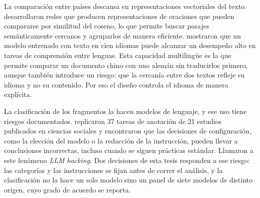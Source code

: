 La comparación entre países descansa en representaciones vectoriales del texto.
\citet{reimers2019sentencebert} desarrollaron redes que producen representaciones de
oraciones que pueden compararse por similitud del coseno, lo que permite buscar pasajes
semánticamente cercanos y agruparlos de manera eficiente. \citet{conneau2020unsupervised}
mostraron que un modelo entrenado con texto en cien idiomas puede alcanzar un desempeño
alto en tareas de comprensión entre lenguas. Esta capacidad multilingüe es la que permite
comparar un documento chino con uno alemán sin traducirlos primero, aunque también
introduce un riesgo: que la cercanía entre dos textos refleje su idioma y no su contenido.
Por eso el diseño controla el idioma de manera explícita.

La clasificación de los fragmentos la hacen modelos de lenguaje, y ese uso tiene riesgos
documentados. \citet{baumann2025llmhacking} replicaron 37 tareas de anotación de 21
estudios publicados en ciencias sociales y encontraron que las decisiones de
configuración, como la elección del modelo o la redacción de la instrucción, pueden llevar
a conclusiones incorrectas, incluso cuando se siguen prácticas estándar. Llamaron a este
fenómeno \textit{LLM hacking}. Dos decisiones de esta tesis responden a ese riesgo: las
categorías y las instrucciones se fijan antes de correr el análisis, y la clasificación no
la hace un solo modelo sino un panel de siete modelos de distinto origen, cuyo grado de
acuerdo se reporta.
